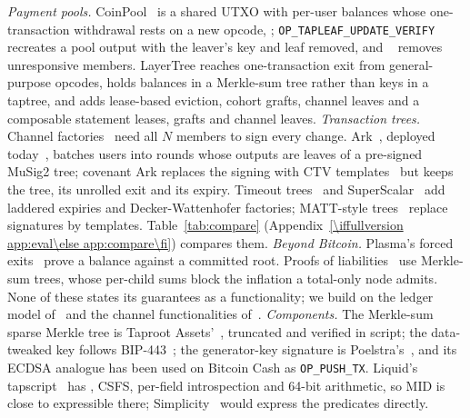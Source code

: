 
\emph{Payment pools.} CoinPool~\cite{coinpool} is a shared UTXO with
per-user balances whose one-transaction withdrawal rests on a new opcode,
; \texttt{OP\_TAPLEAF\_\allowbreak UPDATE\_\allowbreak VERIFY}~\cite{tluv} recreates a pool
output with the leaver's key and leaf removed, and ~\cite{opevict}
removes unresponsive members. LayerTree reaches one-transaction exit
from general-purpose opcodes, holds balances in a
Merkle-sum tree rather than keys in a taptree, and adds \iffullversion lease-based
eviction, cohort grafts, channel leaves and a composable statement\else
leases, grafts and channel leaves\fi.
\emph{Transaction trees.} Channel factories~\cite{factories} need all $N$
members to sign every change. Ark~\cite{ark}\iffullversion, deployed today~\cite{arkd},\fi{} batches users into rounds whose outputs are leaves of a pre-signed MuSig2
tree; covenant Ark replaces the signing with CTV
templates~\cite{clark} but keeps the tree, its unrolled exit and its expiry. Timeout
trees~\cite{timeouttrees} and SuperScalar~\cite{superscalar} add laddered
expiries and Decker-Wattenhofer factories; MATT-style
trees~\cite{matt,bip443} replace signatures by templates.
Table~\ref{tab:compare} (Appendix~\ref{\iffullversion app:eval\else app:compare\fi}) compares them. \emph{Beyond Bitcoin.} Plasma's forced exits~\cite{plasma} prove a
balance against a committed root. Proofs of
liabilities~\cite{gpol,brokensolvency} use Merkle-sum trees, whose
per-child sums block the inflation a total-only node admits.\iffullversion{} None of these states its guarantees as a
functionality; we build on the ledger model of~\cite{bmtz17} and the
channel functionalities of~\cite{genchannels,gscn}.\fi{} \iffullversion\emph{Components.} The Merkle-sum sparse Merkle tree is Taproot Assets'~\cite{mssmt}, truncated and verified in script; the data-tweaked key follows BIP-443~\cite{bip443}; the generator-key signature is Poelstra's~\cite{catschnorr}, and its ECDSA analogue has been used on Bitcoin Cash as \texttt{OP\_PUSH\_TX}. Liquid's tapscript~\cite{elements} has , CSFS, per-field introspection and 64-bit arithmetic, so MID is close to expressible there; Simplicity~\cite{simplicity} would express the predicates directly.\fi
